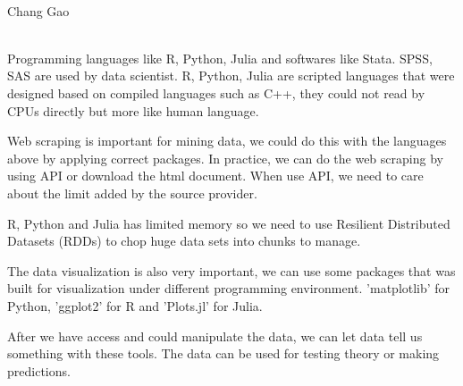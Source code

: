 \documentclass[12pt,letterpaper]{article}
\begin{document}
	\begin{center}
		\smallskip\\
		Chang Gao\smallskip\\
	\end{center}
	\smallskip\\
Programming languages like R, Python, Julia and softwares like Stata. SPSS, SAS are used by data scientist.  R, Python, Julia are scripted languages that were designed based on compiled languages such as C++, they could not read by CPUs directly but more like human language.

Web scraping is important for mining data, we could do this with the languages above by applying correct packages. In practice, we can do the web scraping by using API or download the html document. When use API, we need to care about the limit added by the source provider.

R, Python and Julia has limited memory so we need to use Resilient Distributed Datasets (RDDs) to chop huge data sets into chunks to manage.

The data visualization is also very important, we can use some packages that was built for visualization under different programming environment. 'matplotlib' for Python, 'ggplot2' for R and 'Plots.jl' for Julia.

After we have access and could manipulate the data, we can let data tell us something with these tools. The data can be used for testing theory or making predictions.
\end{document}
